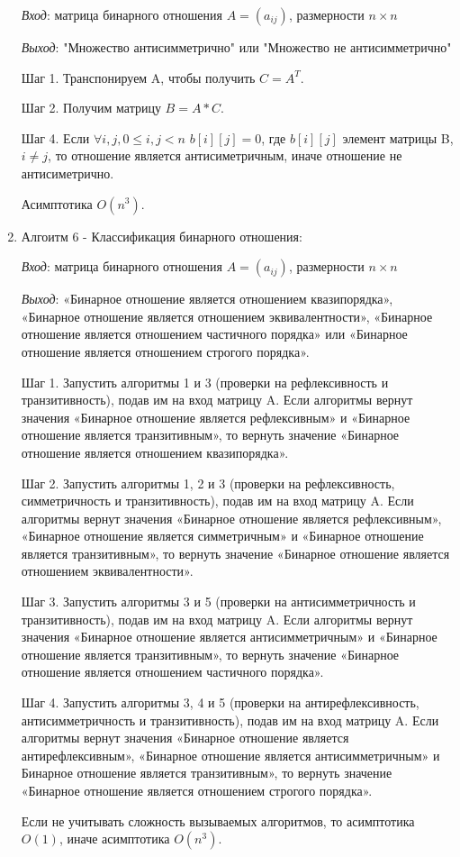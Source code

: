 \documentclass[spec, och, labwork]{shiza}
\begin{document}
\begin{enumerate}
                \textit{Вход}: матрица бинарного отношения $A = (a_{ij})$, размерности $n \times n$

                \textit{Выход}: "Множество антисимметрично" или "Множество не антисимметрично"

                Шаг 1. Транспонируем A, чтобы получить $C = A^T$.

                Шаг 2. Получим матрицу $B = A * C$.

                Шаг 4. Если $ \forall i, j, 0 \leq i, j < n$ $b[i][j]  = 0$, где 
                $b[i][j]$ элемент матрицы B, $i \neq j$, то отношение является антисиметричным, иначе отношение не антисиметрично.

                Асимптотика $O(n^3)$.

                \item Алгоитм 6 - Классификация бинарного отношения:
                
                \textit{Вход}: матрица бинарного отношения $A = (a_{ij})$, размерности $n \times n$

                \textit{Выход}: «Бинарное отношение является отношением квазипорядка», «Бинарное отношение является отношением 
                эквивалентности», «Бинарное отношение является отношением частичного порядка» или «Бинарное отношение 
                является отношением строгого порядка».

                Шаг 1. Запустить алгоритмы 1 и 3 (проверки на рефлексивность и транзитивность), подав им на вход матрицу A. Если алгоритмы вернут значения «Бинарное отношение является рефлексивным» и «Бинарное отношение является транзитивным», то вернуть значение «Бинарное отношение является отношением квазипорядка».

                Шаг 2. Запустить алгоритмы 1, 2 и 3 (проверки на рефлексивность, симметричность и транзитивность), подав им на вход матрицу A. Если алгоритмы вернут значения «Бинарное отношение является рефлексивным», «Бинарное отношение является симметричным» и «Бинарное отношение является транзитивным», то вернуть значение «Бинарное отношение является отношением эквивалентности».

                Шаг 3. Запустить алгоритмы 3 и 5 (проверки на антисимметричность и транзитивность), подав им на вход матрицу A. Если алгоритмы вернут значения «Бинарное отношение является антисимметричным» и «Бинарное отношение является транзитивным», то вернуть значение «Бинарное отношение является отношением частичного порядка».

                Шаг 4. Запустить алгоритмы 3, 4 и 5 (проверки на антирефлексивность, антисимметричность и транзитивность), подав им на вход матрицу A. Если алгоритмы вернут значения «Бинарное отношение является антирефлексивным», «Бинарное отношение является антисимметричным» и Бинарное отношение является транзитивным», то вернуть значение «Бинарное отношение является отношением строгого порядка».

                Если не учитывать сложность вызываемых алгоритмов, то асимптотика $O(1)$, иначе асимптотика $O(n^3)$.

            \end{enumerate}
        
\end{document}
